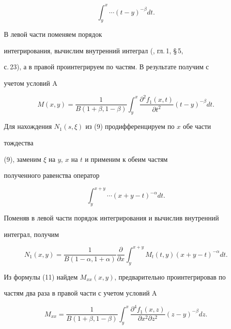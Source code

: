 $$ 


\int^x_y\dotsb(t-y)^{-\beta}dt. 


$$ 


В левой части поменяем порядок 


интегрирования, вычислим внутренний интеграл (\cite{1}, гл.\,1, \S\,5, 


с.\,23), а в правой проинтегрируем по частям. В результате получим с 


учетом условий A 


\begin{equation} 


M(x,y)=\frac{1}{B(1+\beta,1-\beta)}\int^x_y 


\frac{\partial^2f_1(x,t)}{\partial t^2}(t-y)^{-\beta}dt. 


\end{equation} 


 


Для нахождения $N_1(s,\xi)$ из (9) продифференцируем по $x$ обе части 


тождества 


(9), заменим $\xi$ на $y$, $x$ на $t$ и применим к обеим частям 


полученного равенства оператор 


$$ 


\int^{x+y}_y\dotsb(x+y-t)^{-\alpha}dt. 


$$ 


Поменяв в левой части порядок интегрирования и вычислив внутренний 


интеграл, получим 


\begin{equation} 


N_1(x,y)=\frac{1}{B(1-\alpha,1+\alpha)} 


\frac{\partial}{\partial x}\int^{x+y}_y 


M_t(t,y)(x+y-t)^{-\alpha}dt. 


\end{equation} 


Из формулы (11) найдем $M_{xx}(x,y)$, предварительно проинтегрировав по 


частям два раза в правой части с учетом условий A 


\begin{equation} 


M_{xx}=\frac{1}{B(1+\beta,1-\beta)}\int^x_y 


\frac{\partial^4f_1(x,z)}{\partial x^2\partial z^2} 


(z-y)^{-\beta}dz. 


\end{equation} 



